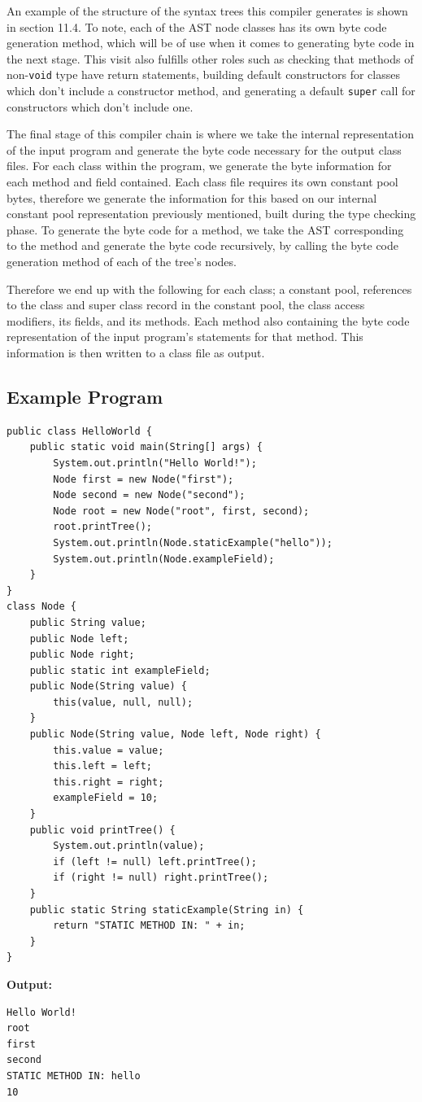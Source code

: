 \documentclass[a4paper, 11pt]{article}
\begin{document}
An example of the structure of the syntax trees this compiler generates is shown in section 11.4. To note, each of the AST node classes has its own byte code generation method, which will be of use when it comes to generating byte code in the next stage. This visit also fulfills other roles such as checking that methods of non-\texttt{void} type have return statements, building default constructors for classes which don't include a constructor method, and generating a default \texttt{super} call for constructors which don't include one.

The final stage of this compiler chain is where we take the internal representation of the input program and generate the byte code necessary for the output class files. For each class within the program, we generate the byte information for each method and field contained. Each class file requires its own constant pool bytes, therefore we generate the information for this based on our internal constant pool representation previously mentioned, built during the type checking phase. To generate the byte code for a method, we take the AST corresponding to the method and generate the byte code recursively, by calling the byte code generation method of each of the tree's nodes.

Therefore we end up with the following for each class; a constant pool, references to the class and super class record in the constant pool, the class access modifiers, its fields, and its methods. Each method also containing the byte code representation of the input program's statements for that method. This information is then written to a class file as output.

\newpage
\subsection{Example Program}
\begin{Verbatim}[tabsize=4]
public class HelloWorld {
    public static void main(String[] args) {
        System.out.println("Hello World!");
        Node first = new Node("first");
        Node second = new Node("second");
        Node root = new Node("root", first, second);
        root.printTree();
        System.out.println(Node.staticExample("hello"));
        System.out.println(Node.exampleField);
    }
}
class Node {
    public String value;
    public Node left;
    public Node right;
    public static int exampleField;
    public Node(String value) {
        this(value, null, null);
    }
    public Node(String value, Node left, Node right) {
        this.value = value;
        this.left = left;
        this.right = right;
        exampleField = 10;
    }
    public void printTree() {
        System.out.println(value);
        if (left != null) left.printTree();
        if (right != null) right.printTree();
    }
    public static String staticExample(String in) {
        return "STATIC METHOD IN: " + in;
    }
}
\end{Verbatim}
\textbf{Output:}
\begin{Verbatim}
Hello World!
root
first
second
STATIC METHOD IN: hello
10
\end{Verbatim}
\newpage
\end{document}
